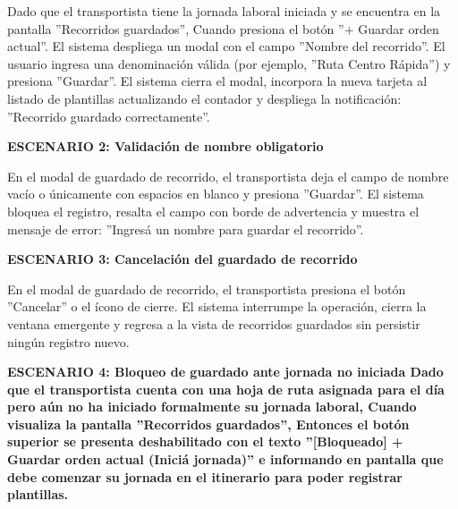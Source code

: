 \documentclass[a4paper,9pt]{article}
\begin{document}
\begin{tcolorbox}[hucard, title={\textbf{HU-26: GUARDAR RECORRIDO} \hfill \scriptsize \colorbox{tealstatus}{\textbf{\ Accepted\ }} \quad \colorbox{white}{\textcolor{primarydark}{\textbf{\ 5 pts\ }}}}]
{Dado que el transportista tiene la jornada laboral iniciada y se encuentra en la pantalla ''Recorridos guardados'', Cuando presiona el botón ''+ Guardar orden actual''. El sistema despliega un modal con el campo ''Nombre del recorrido''. El usuario ingresa una denominación válida (por ejemplo, ''Ruta Centro Rápida'') y presiona ''Guardar''. El sistema cierra el modal, incorpora la nueva tarjeta al listado de plantillas actualizando el contador y despliega la notificación: ''Recorrido guardado correctamente''.\par\vspace{2.5pt}
\noindent\textbf{\textcolor{secondarydark}{ESCENARIO 2:  Validación de nombre obligatorio}}\par\vspace{1pt}
En el modal de guardado de recorrido, el transportista deja el campo de nombre vacío o únicamente con espacios en blanco y presiona ''Guardar''. El sistema bloquea el registro, resalta el campo con borde de advertencia y muestra el mensaje de error: ''Ingresá un nombre para guardar el recorrido''.\par\vspace{2.5pt}
\noindent\textbf{\textcolor{secondarydark}{ESCENARIO 3:  Cancelación del guardado de recorrido}}\par\vspace{1pt}
En el modal de guardado de recorrido, el transportista presiona el botón ''Cancelar'' o el ícono de cierre. El sistema interrumpe la operación, cierra la ventana emergente y regresa a la vista de recorridos guardados sin persistir ningún registro nuevo.\par\vspace{2.5pt}
\noindent\textbf{\textcolor{secondarydark}{ESCENARIO 4:  Bloqueo de guardado ante jornada no iniciada Dado que el transportista cuenta con una hoja de ruta asignada para el día pero aún no ha iniciado formalmente su jornada laboral, Cuando visualiza la pantalla ''Recorridos guardados'', Entonces el botón superior se presenta deshabilitado con el texto ''[Bloqueado] + Guardar orden actual (Iniciá jornada)'' e informando en pantalla que debe comenzar su jornada en el itinerario para poder registrar plantillas.}}\par\vspace{1pt}
}\par
\end{tcolorbox}
\end{document}
